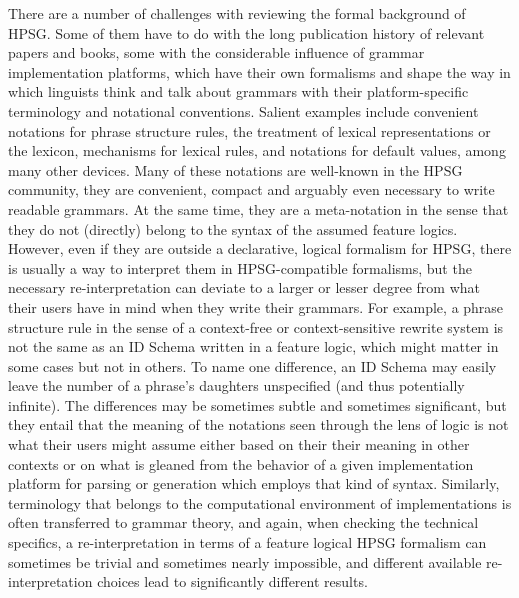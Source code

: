 \documentclass[output=paper
                ,modfonts
                ,nonflat
	        ,collection
	        ,collectionchapter
	        ,collectiontoclongg
 	        ,biblatex
                ,babelshorthands
                ,newtxmath
                ,draftmode
                ,colorlinks, citecolor=brown
]{./langsci/langscibook}
\begin{document}
{There are a number of challenges with reviewing the formal background
of HPSG. Some of them have to do with the long publication history of relevant papers and books, some
with the considerable influence of grammar implementation platforms, which have
their own formalisms and shape the way in which
linguists think and talk about grammars with their platform-specific terminology
and notational conventions. %
Salient examples include convenient
notations for phrase structure rules, the treatment of lexical
representations or the lexicon, mechanisms for lexical rules, and
notations for default values, among many other devices.  Many of these
notations are well-known in the HPSG community, they are convenient,
compact and arguably even necessary to write readable grammars. At
the same time, they are
a meta-notation in the sense that they
do not (directly) belong to the syntax of the assumed feature logics.
However, even if they are outside a declarative, logical formalism for HPSG,
there is usually a way to
interpret them in HPSG-compatible formalisms, but the necessary
re-interpretation can deviate to a larger or lesser degree from
what their users have in mind when they write their grammars. For example,
a phrase structure rule in the sense of a context-free or context-sensitive
rewrite system is not the same as an ID Schema written in a feature logic, which
might matter in some cases but not in others. To name one difference,
an ID Schema may easily leave the number of a phrase's daughters unspecified (and
thus potentially infinite).
The differences may be sometimes subtle and sometimes significant, but
they entail that the meaning of the notations seen through the lens
of logic is not what their users might assume either
based on their their meaning in other contexts or on what is gleaned 
from the behavior
of a given implementation platform for parsing or generation which
employs that kind of syntax.
Similarly, terminology that belongs to the computational environment
of implementations is often transferred to grammar theory, and
again, when checking the technical specifics, a re-interpretation in terms of a feature logical HPSG
formalism can sometimes be trivial and sometimes nearly impossible,
and different available re-interpretation choices
lead to significantly different results.

}
\end{document}
